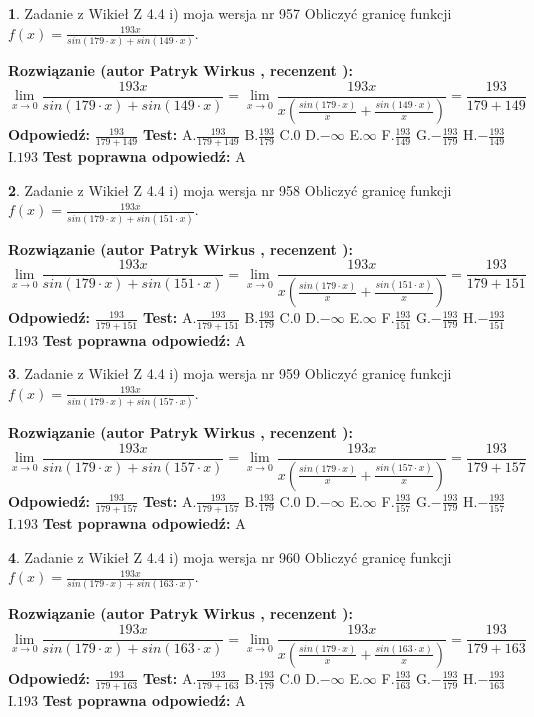 \documentclass[12pt, a4paper]{article}
\theoremstyle{definition} %
\newtheorem{zad}{}
\newcommand{\zadStart}[1]{\begin{zad}#1\newline}
\newcommand{\zadStop}{\end{zad}}
\newcommand{\rozwStart}[2]{\noindent \textbf{Rozwiązanie (autor #1 , recenzent #2): }\newline}
\newcommand{\rozwStop}{\newline}
\newcommand{\odpStart}{\noindent \textbf{Odpowiedź:}\newline}
\newcommand{\odpStop}{\newline}
\newcommand{\testStart}{\noindent \textbf{Test:}\newline}
\newcommand{\testStop}{\newline}
\newcommand{\kluczStart}{\noindent \textbf{Test poprawna odpowiedź:}\newline}
\newcommand{\kluczStop}{\newline}
\begin{document}
\zadStart{Zadanie z Wikieł Z 4.4 i) moja wersja nr 957}
Obliczyć granicę funkcji $f(x)=\frac{193x}{sin(179\cdot x) +sin(149\cdot x)}$.
\zadStop
\rozwStart{Patryk Wirkus}{}
$$\lim\limits_{x\to 0}\frac{193x}{sin(179\cdot x) +sin(149\cdot x)}=\lim\limits_{x\to 0}\frac{193x}{x(\frac{sin(179\cdot x)}{x}+\frac{sin(149\cdot x)}{x})}=\frac{193}{179+149}$$
\rozwStop
\odpStart
$\frac{193}{179+149}$
\odpStop
\testStart
A.$\frac{193}{179+149}$
B.$\frac{193}{179}$
C.$0$
D.$-\infty$
E.$\infty$
F.$\frac{193}{149}$
G.$-\frac{193}{179}$
H.$-\frac{193}{149}$
I.$193$
\testStop
\kluczStart
A
\kluczStop



\zadStart{Zadanie z Wikieł Z 4.4 i) moja wersja nr 958}
Obliczyć granicę funkcji $f(x)=\frac{193x}{sin(179\cdot x) +sin(151\cdot x)}$.
\zadStop
\rozwStart{Patryk Wirkus}{}
$$\lim\limits_{x\to 0}\frac{193x}{sin(179\cdot x) +sin(151\cdot x)}=\lim\limits_{x\to 0}\frac{193x}{x(\frac{sin(179\cdot x)}{x}+\frac{sin(151\cdot x)}{x})}=\frac{193}{179+151}$$
\rozwStop
\odpStart
$\frac{193}{179+151}$
\odpStop
\testStart
A.$\frac{193}{179+151}$
B.$\frac{193}{179}$
C.$0$
D.$-\infty$
E.$\infty$
F.$\frac{193}{151}$
G.$-\frac{193}{179}$
H.$-\frac{193}{151}$
I.$193$
\testStop
\kluczStart
A
\kluczStop



\zadStart{Zadanie z Wikieł Z 4.4 i) moja wersja nr 959}
Obliczyć granicę funkcji $f(x)=\frac{193x}{sin(179\cdot x) +sin(157\cdot x)}$.
\zadStop
\rozwStart{Patryk Wirkus}{}
$$\lim\limits_{x\to 0}\frac{193x}{sin(179\cdot x) +sin(157\cdot x)}=\lim\limits_{x\to 0}\frac{193x}{x(\frac{sin(179\cdot x)}{x}+\frac{sin(157\cdot x)}{x})}=\frac{193}{179+157}$$
\rozwStop
\odpStart
$\frac{193}{179+157}$
\odpStop
\testStart
A.$\frac{193}{179+157}$
B.$\frac{193}{179}$
C.$0$
D.$-\infty$
E.$\infty$
F.$\frac{193}{157}$
G.$-\frac{193}{179}$
H.$-\frac{193}{157}$
I.$193$
\testStop
\kluczStart
A
\kluczStop



\zadStart{Zadanie z Wikieł Z 4.4 i) moja wersja nr 960}
Obliczyć granicę funkcji $f(x)=\frac{193x}{sin(179\cdot x) +sin(163\cdot x)}$.
\zadStop
\rozwStart{Patryk Wirkus}{}
$$\lim\limits_{x\to 0}\frac{193x}{sin(179\cdot x) +sin(163\cdot x)}=\lim\limits_{x\to 0}\frac{193x}{x(\frac{sin(179\cdot x)}{x}+\frac{sin(163\cdot x)}{x})}=\frac{193}{179+163}$$
\rozwStop
\odpStart
$\frac{193}{179+163}$
\odpStop
\testStart
A.$\frac{193}{179+163}$
B.$\frac{193}{179}$
C.$0$
D.$-\infty$
E.$\infty$
F.$\frac{193}{163}$
G.$-\frac{193}{179}$
H.$-\frac{193}{163}$
I.$193$
\testStop
\kluczStart
A
\kluczStop
\end{document}
